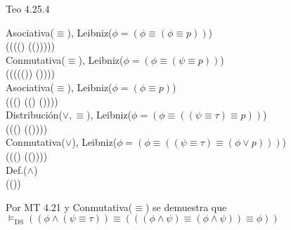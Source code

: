 \documentclass{article}
\begin{document}
\begin{logicenv}{Teo 4.25.4}
\begin{derivation}
        Asociativa($\equiv$), Leibniz($\phi = (\phi \equiv (\phi \equiv p))$)\\
            (\phi \equiv (\psi \equiv ((\phi \lor \psi) \equiv (\tau  \equiv (\phi \lor \psi)))))\\
        Conmutativa($\equiv$), Leibniz($\phi = (\phi \equiv (\psi \equiv p))$)\\
            (\phi \equiv (\psi \equiv ((\tau  \equiv (\phi \lor \psi)) \equiv (\phi \lor \psi))))\\
        Asociativa($\equiv$), Leibniz($\phi = (\phi \equiv p)$)\\
            (\phi \equiv ((\phi \equiv \tau) \equiv ((\phi \lor \tau) \equiv (\phi \lor \psi))))\\
        Distribución($\lor, \equiv$), Leibniz($\phi = (\phi \equiv ((\psi \equiv \tau)\equiv p))$)\\
            (\phi \equiv ((\psi \equiv \tau) \equiv (\phi \lor (\tau \equiv \psi))))\\
        Conmutativa($\lor$), Leibniz($\phi = (\phi \equiv ((\psi \equiv \tau) \equiv (\phi \lor p)))$)\\
            (\phi \equiv ((\psi \equiv \tau) \equiv (\phi \lor (\psi \equiv \tau))))\\
        Def.($\land$)\\
            (\phi \land (\psi \equiv \tau))
    \end{derivation}
    Por MT 4.21 y Conmutativa($\equiv$) se demuestra que\\
    $\vDash_{\text{DS}} ((\phi \land (\psi \equiv \tau)) \equiv (((\phi \land \psi) \equiv (\phi \land \psi)) \equiv \phi))$
\end{logicenv}
\end{document}
